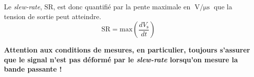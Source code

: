 Le \textit{slew-rate}, $\mathrm{SR}$, est donc quantifié par la pente maximale en $\operatorname{V/\mu s}$ que la tension de sortie peut atteindre.
\begin{equation*}
\mathrm{SR}=\text{max} \left( \frac{dV_\text{s}}{dt} \right )
\end{equation*}

\textbf{Attention aux conditions de mesures, en particulier, toujours s'assurer que le signal n'est pas déformé par le  \textit{slew-rate} lorsqu'on mesure la bande passante !}

